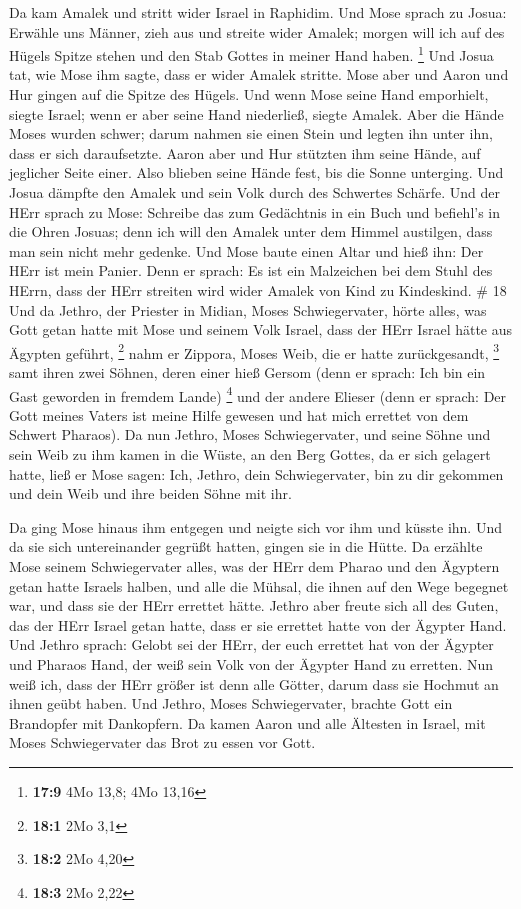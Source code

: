  Da kam Amalek und stritt wider Israel in Raphidim.
 Und Mose sprach zu Josua: Erwähle uns Männer, zieh aus und
streite wider Amalek; morgen will ich auf des Hügels Spitze stehen und
den Stab Gottes in meiner Hand haben. \footnote{\textbf{17:9} 4Mo 13,8;
  4Mo 13,16}  Und Josua tat, wie Mose ihm sagte, dass er
wider Amalek stritte. Mose aber und Aaron und Hur gingen auf die Spitze
des Hügels.  Und wenn Mose seine Hand emporhielt, siegte
Israel; wenn er aber seine Hand niederließ, siegte Amalek. 
Aber die Hände Moses wurden schwer; darum nahmen sie einen Stein und
legten ihn unter ihn, dass er sich daraufsetzte. Aaron aber und Hur
stützten ihm seine Hände, auf jeglicher Seite einer. Also blieben seine
Hände fest, bis die Sonne unterging.  Und Josua dämpfte den
Amalek und sein Volk durch des Schwertes Schärfe.  Und der
HErr sprach zu Mose: Schreibe das zum Gedächtnis in ein Buch und
befiehl's in die Ohren Josuas; denn ich will den Amalek unter dem Himmel
austilgen, dass man sein nicht mehr gedenke.  Und Mose
baute einen Altar und hieß ihn: Der HErr ist mein Panier. 
Denn er sprach: Es ist ein Malzeichen bei dem Stuhl des HErrn, dass der
HErr streiten wird wider Amalek von Kind zu Kindeskind. \# 18
 Und da Jethro, der Priester in Midian, Moses
Schwiegervater, hörte alles, was Gott getan hatte mit Mose und seinem
Volk Israel, dass der HErr Israel hätte aus Ägypten geführt, \footnote{\textbf{18:1}
  2Mo 3,1}  nahm er Zippora, Moses Weib, die er hatte
zurückgesandt, \footnote{\textbf{18:2} 2Mo 4,20}  samt ihren
zwei Söhnen, deren einer hieß Gersom (denn er sprach: Ich bin ein Gast
geworden in fremdem Lande) \footnote{\textbf{18:3} 2Mo 2,22}
 und der andere Elieser (denn er sprach: Der Gott meines
Vaters ist meine Hilfe gewesen und hat mich errettet von dem Schwert
Pharaos).  Da nun Jethro, Moses Schwiegervater, und seine
Söhne und sein Weib zu ihm kamen in die Wüste, an den Berg Gottes, da er
sich gelagert hatte,  ließ er Mose sagen: Ich, Jethro, dein
Schwiegervater, bin zu dir gekommen und dein Weib und ihre beiden Söhne
mit ihr.

 Da ging Mose hinaus ihm entgegen und neigte sich vor ihm
und küsste ihn. Und da sie sich untereinander gegrüßt hatten, gingen sie
in die Hütte.  Da erzählte Mose seinem Schwiegervater alles,
was der HErr dem Pharao und den Ägyptern getan hatte Israels halben, und
alle die Mühsal, die ihnen auf den Wege begegnet war, und dass sie der
HErr errettet hätte.  Jethro aber freute sich all des Guten,
das der HErr Israel getan hatte, dass er sie errettet hatte von der
Ägypter Hand.  Und Jethro sprach: Gelobt sei der HErr, der
euch errettet hat von der Ägypter und Pharaos Hand, der weiß sein Volk
von der Ägypter Hand zu erretten.  Nun weiß ich, dass der
HErr größer ist denn alle Götter, darum dass sie Hochmut an ihnen geübt
haben.  Und Jethro, Moses Schwiegervater, brachte Gott ein
Brandopfer mit Dankopfern. Da kamen Aaron und alle Ältesten in Israel,
mit Moses Schwiegervater das Brot zu essen vor Gott.


